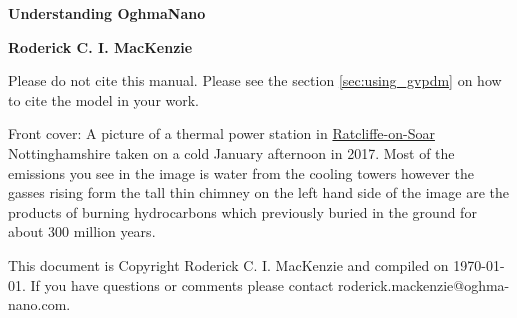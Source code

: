 \color{white}

\begin{titlepage}
   \begin{center}
      \Huge\textbf{Understanding OghmaNano}
   \end{center}

   \begin{center}
      \large\textbf{Roderick C. I. MacKenzie}
   \end{center}


\addtolength{\wpXoffset}{-10cm}
\end{titlepage}




\color{black}


\newpage

\ClearWallPaper

\vspace*{\fill}
Please do not cite this manual.  Please see the section \ref{sec:using_gvpdm} on how to cite the model in your work.
\vspace*{\fill}

Front cover: A picture of a thermal power station in \href{https://en.wikipedia.org/wiki/Ratcliffe-on-Soar_Power_Station}{Ratcliffe-on-Soar} Nottinghamshire taken on a cold January afternoon in 2017. Most of the emissions you see in the image is water from the cooling towers however the gasses rising form the tall thin chimney on the left hand side of the image are the products of burning hydrocarbons which previously buried in the ground for about 300 million years.

\newpage
\ClearWallPaper

\vspace*{\fill}
This document is Copyright Roderick C. I. MacKenzie and compiled on \monthdayyeardate\today. If you have questions or comments please contact roderick.mackenzie@oghma-nano.com.
\vspace*{\fill}

\tableofcontents
